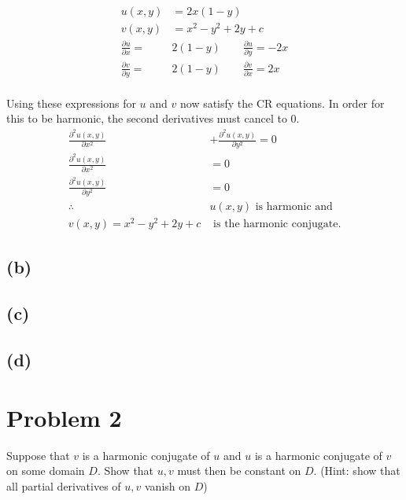 \documentclass{article}
\newcommand{\parder}[2]{\frac{\partial#1}{\partial#2}}
\newcommand{\secparder}[2]{\frac{\partial^2#1}{\partial#2^2}}
\begin{document}
\begin{align*}
  u(x,y) &= 2x(1-y)\\
  v(x,y) &= x^2-y^2 + 2y + c\\
  \parder{u}{x} = &2(1-y) \quad \quad \parder{u}{y} = -2x\\
  \parder{v}{y} = &2(1-y)  \quad \quad \parder{v}{x} = 2x \\
\end{align*}

Using these expressions for $u$ and $v$ now satisfy the CR equations. In order for this to be harmonic, the second derivatives must cancel to 0.
\begin{align*}
  \secparder{u(x,y)}{x} &+ \secparder{u(x,y)}{y} = 0\\
  \secparder{u(x,y)}{x} &= 0\\
  \secparder{u(x,y)}{y} &= 0 \\
  \therefore &u(x,y) \text{ is harmonic and }\\
  v(x,y) = x^2-y^2 + 2y + c &\text{ is the harmonic conjugate.}
\end{align*}
\subsection*{(b)}
\subsection*{(c)}
\subsection*{(d)}

\newpage
\section*{Problem 2}
Suppose that $v$ is a harmonic conjugate of $u$ and $u$ is a harmonic conjugate of $v$ on some domain $D$. Show that $u,v$ must then be constant on $D$. (Hint: show that all partial derivatives of $u,v$ vanish on $D$)
\end{document}
